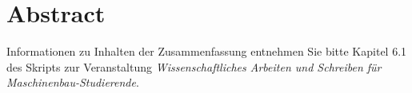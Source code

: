 \section*{Abstract}
Informationen zu Inhalten der Zusammenfassung entnehmen Sie bitte Kapitel 6.1 des Skripts zur Veranstaltung \textit{Wissenschaftliches Arbeiten und Schreiben für Maschinenbau-Studierende}.
	
\blindtext

\blindtext

\blindtext